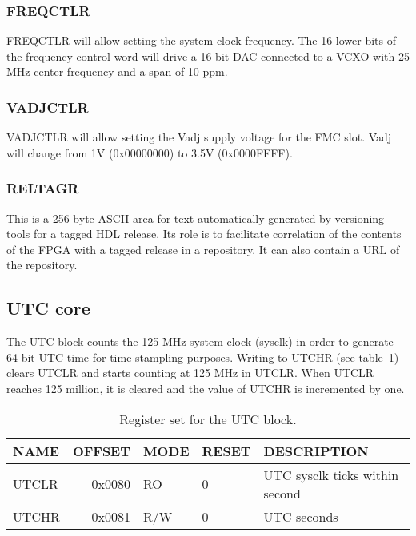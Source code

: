 \documentclass[a4paper]{article}
\begin{document}
\subsubsection{FREQCTLR}
\label{sssec:freqctlr}
FREQCTLR will allow setting the system clock frequency. The 16 lower bits of the frequency control word will drive a 16-bit DAC connected to a VCXO with 25 MHz center frequency and a span of 10 ppm. 

\subsubsection{VADJCTLR}
VADJCTLR will allow setting the Vadj supply voltage for the FMC slot. Vadj will change from 1V (0x00000000) to 3.5V (0x0000FFFF). 

\subsubsection{RELTAGR}
This is a 256-byte ASCII area for text automatically generated by versioning tools for a tagged HDL release. Its role is to facilitate correlation of the contents of the FPGA with a tagged release in a repository. It can also contain a URL of the repository.

\subsection{UTC core}
The UTC block counts the 125 MHz system clock (sysclk) in order to generate 64-bit UTC time for time-stampling purposes. Writing to UTCHR (see table~\ref{tab:utc_core}) clears UTCLR and starts counting at 125 MHz in UTCLR. When UTCLR reaches 125 million, it is cleared and the value of UTCHR is incremented by one.

\begin{table}[htbp]
  \centering
  \begin{tabularx}{\textwidth}{|l|r|l|l|X|}
    \hline
    \textbf{NAME} & \textbf{OFFSET} & \textbf{MODE} & \textbf{RESET} & \textbf{DESCRIPTION} \\
    \hline
    \hline
    UTCLR & 0x0080 & RO & 0 & UTC sysclk ticks within second\\
    \hline
    UTCHR & 0x0081 & R/W & 0 & UTC seconds\\
    \hline
  \end{tabularx}
  \caption{Register set for the UTC block.}
  \label{tab:utc_core}
\end{table}
\end{document}
